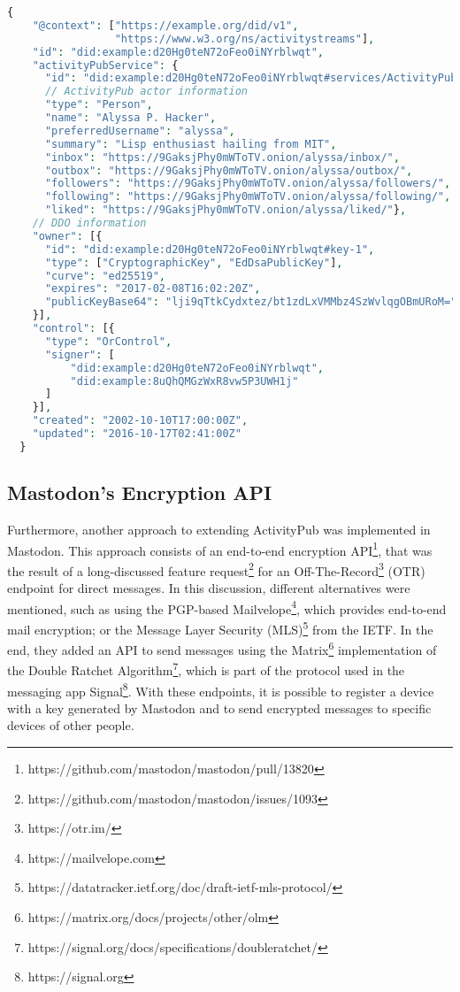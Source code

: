 \lstset{style=JSONStyle}
\begin{lstlisting}[language=PHP, caption=DID document with inserted ActivityPub actor. Adapted from \cite{webber_sporny_2017}, label=lst:did_and_ap, float=h]
  {
    "@context": ["https://example.org/did/v1",
                 "https://www.w3.org/ns/activitystreams"],
    "id": "did:example:d20Hg0teN72oFeo0iNYrblwqt",
    "activityPubService": {
      "id": "did:example:d20Hg0teN72oFeo0iNYrblwqt#services/ActivityPub",
      // ActivityPub actor information
      "type": "Person",
      "name": "Alyssa P. Hacker",
      "preferredUsername": "alyssa",
      "summary": "Lisp enthusiast hailing from MIT",
      "inbox": "https://9GaksjPhy0mWToTV.onion/alyssa/inbox/",
      "outbox": "https://9GaksjPhy0mWToTV.onion/alyssa/outbox/",
      "followers": "https://9GaksjPhy0mWToTV.onion/alyssa/followers/",
      "following": "https://9GaksjPhy0mWToTV.onion/alyssa/following/",
      "liked": "https://9GaksjPhy0mWToTV.onion/alyssa/liked/"},
    // DDO information
    "owner": [{
      "id": "did:example:d20Hg0teN72oFeo0iNYrblwqt#key-1",
      "type": ["CryptographicKey", "EdDsaPublicKey"],
      "curve": "ed25519",
      "expires": "2017-02-08T16:02:20Z",
      "publicKeyBase64": "lji9qTtkCydxtez/bt1zdLxVMMbz4SzWvlqgOBmURoM="
    }],
    "control": [{
      "type": "OrControl",
      "signer": [
          "did:example:d20Hg0teN72oFeo0iNYrblwqt",
          "did:example:8uQhQMGzWxR8vw5P3UWH1j"
      ]
    }],
    "created": "2002-10-10T17:00:00Z",
    "updated": "2016-10-17T02:41:00Z"
  }
\end{lstlisting}

\subsection*{\textbf{Mastodon's Encryption API}}
Furthermore, another approach to extending ActivityPub was implemented in Mastodon. This approach consists of an end-to-end encryption API\footnote{https://github.com/mastodon/mastodon/pull/13820}, that was the result of a long-discussed feature request\footnote{https://github.com/mastodon/mastodon/issues/1093} for an Off-The-Record\footnote{https://otr.im/}  (OTR) endpoint for direct messages. In this discussion, different alternatives were mentioned, such as using the PGP-based Mailvelope\footnote{https://mailvelope.com}, which provides end-to-end mail encryption; or the Message Layer Security (MLS)\footnote{https://datatracker.ietf.org/doc/draft-ietf-mls-protocol/} from the IETF. In the end, they added an API to send messages using the Matrix\footnote{https://matrix.org/docs/projects/other/olm} implementation of the Double Ratchet Algorithm\footnote{https://signal.org/docs/specifications/doubleratchet/}, which is part of the protocol used in the messaging app Signal\footnote{https://signal.org}. With these endpoints, it is possible to register a device with a key generated by Mastodon and to send encrypted messages to specific devices of other people.

